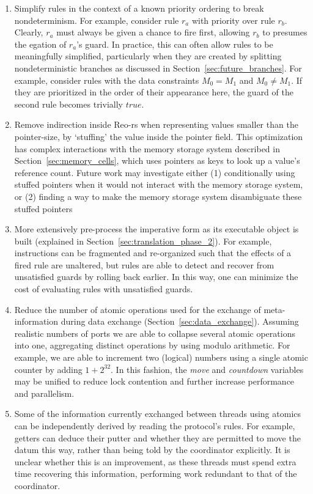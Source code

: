 \begin{enumerate}
	\item Simplify rules in the context of a known priority ordering to break nondeterminism. For example, consider rule $r_a$ with priority over rule $r_b$. Clearly, $r_a$ must always be given a chance to fire first, allowing $r_b$ to presumes the egation of $r_a$'s guard. In practice, this can often allow rules to be meaningfully simplified, particularly when they are created by splitting nondeterministic branches as discussed in Section~\ref{sec:future_branches}. For example, consider rules with the data constraints $M_0=M_1$ and $M_0\neq{}M_1$. If they are prioritized in the order of their appearance here, the guard of the second rule becomes trivially $true$.
	
	\item Remove indirection inside Reo-rs when representing values smaller than the pointer-size, by `stuffing' the value inside the pointer field. This optimization has complex interactions with the memory storage system described in Section~\ref{sec:memory_cells}, which uses pointers as keys to look up a value's reference count. Future work may investigate either (1) conditionally using stuffed pointers when it would not interact with the memory storage system, or (2) finding a way to make the memory storage system disambiguate these stuffed pointers
	
	
	\item More extensively pre-process the imperative form as its executable object is built (explained in Section~\ref{sec:translation_phase_2}). For example, instructions can be fragmented and re-organized such that the effects of a fired rule are unaltered, but rules are able to detect and recover from unsatisfied guards by rolling back earlier. In this way, one can minimize the cost of evaluating rules with unsatisfied guards.
	
	\item Reduce the number of atomic operations used for the exchange of meta-information during data exchange (Section~\ref{sec:data_exchange}). Assuming realistic numbers of ports we are able to collapse several atomic operations into one, aggregating distinct operations by using modulo arithmetic. For example, we are able to increment two (logical) numbers using a single atomic counter by adding $1 + 2^{32}$. In this fashion, the \textit{move} and \textit{countdown} variables may be unified to reduce lock contention and further increase performance and parallelism.
	
	\item Some of the information currently exchanged between threads using atomics can be independently derived by reading the protocol's rules. For example, getters can deduce their putter and whether they are permitted to move the datum this way, rather than being told by the coordinator explicitly. It is unclear whether this is an improvement, as these threads must spend extra time recovering this information, performing work redundant to that of the coordinator. 
\end{enumerate}
